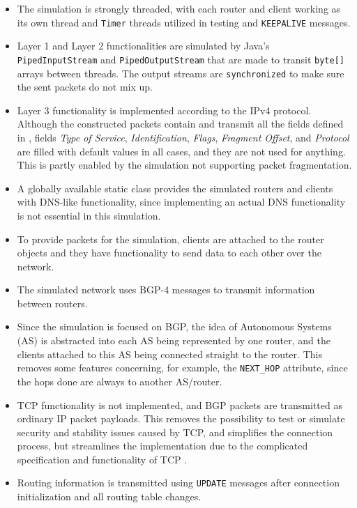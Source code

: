 \documentclass[11pt,a4paper,titlepage]{report}
\begin{document}
\begin{itemize}
\item The simulation is strongly threaded, with each router and client working as its own thread and \texttt{Timer} threads utilized in testing and \texttt{KEEPALIVE} messages.
\item Layer 1 and Layer 2 functionalities are simulated by Java's \texttt{PipedInputStream} and \texttt{PipedOutputStream} that are made to transit \texttt{byte[]} arrays between threads. The output streams are \texttt{synchronized} to make sure the sent packets do not mix up.
\item Layer 3 functionality is implemented according to the IPv4 protocol. Although the constructed packets contain and transmit all the fields defined in \cite{RFC0791}, fields \emph{Type of Service}, \emph{Identification}, \emph{Flags}, \emph{Fragment Offset}, and \emph{Protocol} are filled with default values in all cases, and they are not used for anything. This is partly enabled by the simulation not supporting packet fragmentation.
\item A globally available static class provides the simulated routers and clients with DNS-like functionality, since implementing an actual DNS functionality is not essential in this simulation.
\item To provide packets for the simulation, clients are attached to the router objects and they have functionality to send data to each other over the network.
\item The simulated network uses BGP-4 messages to transmit information between routers.
\item Since the simulation is focused on BGP, the idea of Autonomous Systems (AS) is abstracted into each AS being represented by one router, and the clients attached to this AS being connected straight to the router. This removes some features concerning, for example, the \texttt{NEXT\_HOP} attribute, since the hops done are always to another AS/router.
\item TCP functionality is not implemented, and BGP packets are transmitted as ordinary IP packet payloads. This removes the possibility to test or simulate security and stability issues caused by TCP, and simplifies the connection process, but streamlines the implementation due to the complicated specification and functionality of TCP \cite{RFC0793}.
\item Routing information is transmitted using \texttt{UPDATE} messages after connection initialization and all routing table changes.

\end{itemize}
\end{document}
